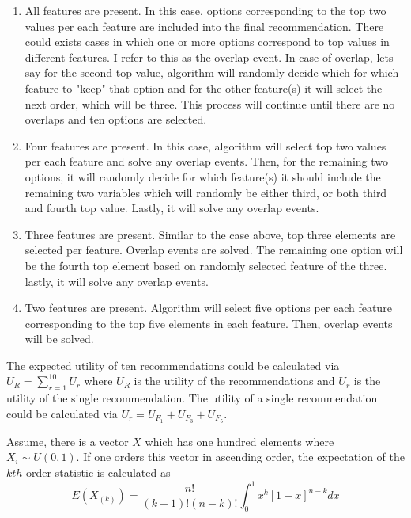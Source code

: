 \documentclass[a4paper,12pt]{article}
\begin{document}
\begin{enumerate}
    \item  All features are present. In this case, options corresponding to the top two values per each feature are included into the final recommendation. There could exists cases in which one or more options correspond to top values in different features. I refer to this as the overlap event. In case of overlap, lets say for the second top value, algorithm will randomly decide which for which feature to "keep" that option and for the other feature(s) it will select the next order, which will be three. This process will continue until there are no overlaps and ten options are selected.
    \item  Four features are present. In this case, algorithm will select top two values per each feature and solve any overlap events. Then, for the remaining two options, it will randomly decide for which feature(s) it should include the remaining two variables which will randomly be either third, or both third and fourth top value. Lastly, it will solve any overlap events.
    \item  Three features are present. Similar to the case above, top three elements are selected per feature. Overlap events are solved. The remaining one option will be the fourth top element based on randomly selected feature of the three. lastly, it will solve any overlap events.
    \item  Two features are present. Algorithm will select five options per each feature corresponding to the top five elements in each feature. Then, overlap events will be solved.
\end{enumerate}


The expected utility of ten recommendations could be calculated via $U_R = \sum_{r = 1}^{10}{U_r}$ where $U_R$ is the utility of the recommendations and $U_r$ is the utility of the single recommendation. The utility of a single recommendation could be calculated via $U_r = U_{F_1} + U_{F_3} + U_{F_5}$.

Assume, there is a vector $X$ which has one hundred elements  where $X_i\sim U\left(0,1\right)$. If one orders this vector in ascending order, the expectation of the $kth$ order statistic is calculated as
$$
E\left(X_{\left(k\right)}\right)=\frac{n!}{\left(k-1\right)!\left(n-k\right)!}\int_{0}^{1}{x^k\left[1-x\right]^{n-k}dx}
$$
\end{document}
